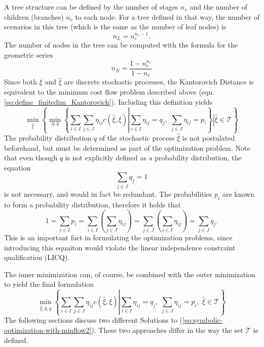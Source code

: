 \documentclass[a4paper, 12pt] {article}
\begin{document}
A tree structure can be defined by the number of stages $n_s$ and the number of children (branches) $n_c$ to each node. For a tree defined in that way, the number of scenarios in this tree (which is the same as the number of leaf nodes) is
\begin{equation}
  \label{eq:number-of-leaf-nodes}
  n_L = n_c^{n_s-1}.
\end{equation}
The number of nodes in the tree can be computed with the formula for the geometric series
\begin{equation}
  \label{eq:number-of-nodes}
  n_N = \frac{1-n_c^{n_s}}{1-n_c}
\end{equation}
Since both $\xi$ and $\hat{\xi}$ are discrete stochastic processes, the Kantorovich Distance is equivalent to the minimum cost flow problem described above (eqn. \ref{eq:define_finitedim_Kantorovich}). Including this definition yields
\begin{equation}
  \label{eq:symbolic-optimization-with-minflow}
  \min_{\hat{\xi}}\left\{\min_{\eta,q}\left\{\sum_{i\in I}\sum_{j\in J}\eta_{ij}c(\hat{\xi}, \xi)\left|\sum_{i\in I}\eta_{ij}=q_j,\;\sum_{j\in J}\eta_{ij}=p_i\right.\right\}\left|\hat{\xi} \in \mathcal{T}\right.\right\}
\end{equation}
The probability distribution $q$ of the stochastic process $\hat{\xi}$ is not postulated beforehand, but must be determined as part of the optimization problem. Note that even though $q$ is not explicitly defined as a probability distribution, the equation
\begin{equation}
  \label{eq:q-schliessbedingung}
  \sum_{j\in J} q_j = 1
\end{equation}
is not necessary, and would in fact be redundant. The probabilities $p_i$ are known to form a probability distribution, therefore it holds that
\begin{equation}
  \label{eq:proof-sum-q-redundant}
  1 = \sum_{i\in I}p_i = \sum_{i\in I}\left(\sum_{j\in J}\eta_{ij}\right)=\sum_{j\in J}\left(\sum_{i\in I}\eta_{ij}\right)=\sum_{j\in J} q_j.
\end{equation}
This is an important fact in formulating the optimization problems, since introducing this equaiton would violate the linear independence constraint qualification (LICQ).

The inner minimization can, of course, be combined with the outer minimization to yield the final formulation
\begin{equation}
  \label{eq:symbolic-optimization-with-minflow2}
  \min_{\hat{\xi},\eta,q}\left\{\sum_{i\in I}\sum_{j\in J}\eta_{ij}c(\hat{\xi}, \xi)\left|\sum_{i\in I}\eta_{ij}=q_j,\;\sum_{j\in J}\eta_{ij}=p_i,\;\hat{\xi} \in \mathcal{T}\right.\right\}
\end{equation}
The following sections discuss two different Solutions to (\ref{eq:symbolic-optimization-with-minflow2}). These two approaches differ in the way the set $\mathcal{T}$ is defined.

\end{document}
